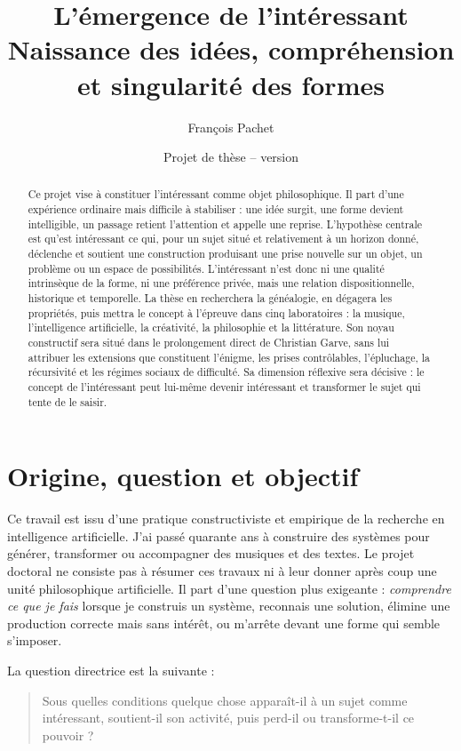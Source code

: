 \documentclass[11pt,a4paper]{article}
\title{L'émergence de l'intéressant\\
\large Naissance des idées, compréhension et singularité des formes}
\author{François Pachet}
\date{Projet de thèse -- version \projectversion\\\small \projectdate}
\begin{document}
\maketitle

\begin{abstract}
Ce projet vise à constituer l'intéressant comme objet philosophique. Il part
d'une expérience ordinaire mais difficile à stabiliser : une idée surgit, une
forme devient intelligible, un passage retient l'attention et appelle une
reprise. L'hypothèse centrale est qu'est intéressant ce qui, pour un sujet situé
et relativement à un horizon donné, déclenche et soutient une construction
produisant une prise nouvelle sur un objet, un problème ou un espace de
possibilités. L'intéressant n'est donc ni une qualité intrinsèque de la forme,
ni une préférence privée, mais une relation dispositionnelle, historique et
temporelle. La thèse en recherchera la généalogie, en dégagera les propriétés,
puis mettra le concept à l'épreuve dans cinq laboratoires : la musique,
l'intelligence artificielle, la créativité, la philosophie et la littérature.
Son noyau constructif sera situé dans le prolongement direct de Christian
Garve, sans lui attribuer les extensions que constituent l'énigme, les prises
contrôlables, l'épluchage, la récursivité et les régimes sociaux de difficulté.
Sa dimension réflexive sera décisive : le concept de l'intéressant peut
lui-même devenir intéressant et transformer le sujet qui tente de le saisir.
\end{abstract}

\section{Origine, question et objectif}

Ce travail est issu d'une pratique constructiviste et empirique de la recherche
en intelligence artificielle. J'ai passé quarante ans à construire des systèmes
pour générer, transformer ou accompagner des musiques et des textes. Le projet
doctoral ne consiste pas à résumer ces travaux ni à leur donner après coup une
unité philosophique artificielle. Il part d'une question plus exigeante :
\emph{comprendre ce que je fais} lorsque je construis un système, reconnais une
solution, élimine une production correcte mais sans intérêt, ou m'arrête devant
une forme qui semble s'imposer.

La question directrice est la suivante :

\begin{quote}
Sous quelles conditions quelque chose apparaît-il à un sujet comme
intéressant, soutient-il son activité, puis perd-il ou transforme-t-il ce
pouvoir ?
\end{quote}
\end{document}
